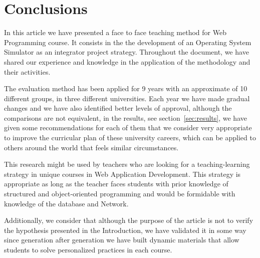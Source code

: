 \section{Conclusions}
\label{sec:Conclusions}


In this article we have presented a face to face teaching method for Web Programming course.
It consists in the the development of an Operating System Simulator as an 
integrator project strategy. 
Throughout the document, we have shared our experience and knowledge in the 
application of the methodology and their activities.

The evaluation method has been applied for 9 years with an approximate of 10 different groups, 
in three different universities.
Each year we have made gradual changes and we have also identified better levels of approval, 
although the comparisons are not equivalent, in the results, see section~\ref{sec:results}, 
we have given some recommendations for each of them that we consider very appropriate to improve the 
curricular plan of these university careers, which can be applied to others around the world that
feels similar circumstances.

This research might be used by teachers who are looking for a teaching-learning strategy in 
unique courses in Web Application Development. 
This strategy is appropriate as long as the teacher faces students with prior knowledge of 
structured and object-oriented programming and would be formidable with knowledge of the 
database and Network.

Additionally, we consider that although the purpose of the article is not to verify the 
hypothesis presented in the Introduction, we have validated it in some way since 
generation after generation we have built dynamic materials that allow students to solve 
personalized practices in each course.